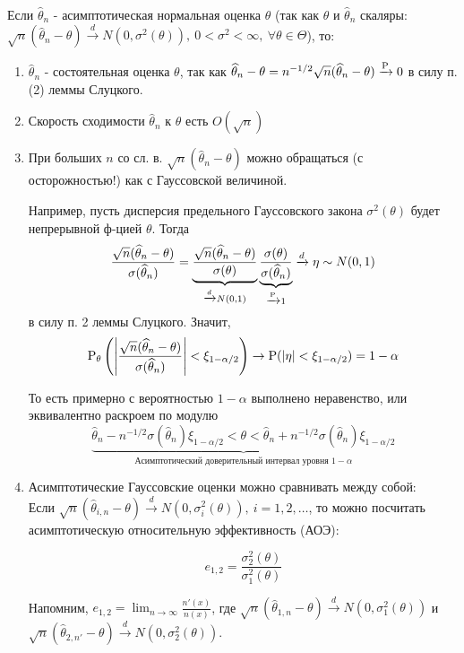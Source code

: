 Если \(\widehat{\theta}_n\) - асимптотическая нормальная оценка \(\theta\) (так как \(\theta\) и \(\widehat{\theta}_n\) скаляры:
\(\sqrt{n}(\widehat{\theta}_n - \theta) \xrightarrow{d} N(0, \sigma^2(\theta)),\ 0 < \sigma^2 < \infty,\ \forall \theta \in \Theta\)), то:
\begin{enumerate}
    \item \(\widehat{\theta}_n\) - состоятельная оценка \(\theta\), так как \(\widehat{\theta}_n - \theta = n^{-1/2} \sqrt{n}(\widehat{\theta}_n - \theta) \xrightarrow{\P} 0\)
        в силу п. (2) леммы Слуцкого.
    \item Скорость сходимости \(\widehat{\theta}_n\) к \(\theta\) есть \(O(\sqrt{n})\)
    \item При больших \(n\) со сл. в. \(\sqrt{n}(\widehat{\theta}_n - \theta)\) можно обращаться (с осторожностью!) как с Гауссовской величиной.

    Например, пусть дисперсия предельного Гауссовского закона \(\sigma^2(\theta)\) будет непрерывной ф-цией \(\theta\). Тогда
    \[ \frac{\sqrt{n}(\widehat{\theta}_n - \theta)}{\sigma(\widehat{\theta}_n)} =
    \underbrace{\frac{\sqrt{n}(\widehat{\theta}_n - \theta)}{\sigma(\theta)}}_{\xrightarrow{d} N(0, 1)}
    \underbrace{\frac{\sigma(\theta)}{\sigma(\widehat{\theta}_n)}}_{\xrightarrow{\P} 1} \xrightarrow{d} \eta \sim N(0, 1)\]
    в силу п. 2 леммы Слуцкого. Значит,
    \[\P_\theta \left(\left\lvert \frac{\sqrt{n}(\widehat{\theta}_n - \theta)}{\sigma(\widehat{\theta}_n)} \right\rvert  < \xi_{1 - \alpha/2}\right) \rightarrow \P(\left\lvert \eta \right\rvert  < \xi_{1 - \alpha/2}) = 1 - \alpha\]

    То есть примерно с вероятностью \(1 - \alpha\) выполнено неравенство, или эквивалентно раскроем по модулю
    \[\underbrace{\widehat{\theta}_n - n^{-1/2}\sigma(\widehat{\theta}_n)\xi_{1 - \alpha /2} < \theta < \widehat{\theta}_n + n^{-1/2}\sigma(\widehat{\theta}_n)\xi_{1 - \alpha /2}}_{\mbox{Асимптотический доверительный интервал уровня \(1 - \alpha\)}}\]

    \item Асимптотические Гауссовские оценки можно сравнивать между собой: \\
    Если \(\sqrt{n} (\widehat{\theta}_{i,n} - \theta) \xrightarrow{d} N(0, \sigma^2_{i}(\theta)),\ i = 1, 2, \ldots\), то
    можно посчитать асимптотическую относительную эффективность (АОЭ):

    \[e_{1,2} = \frac{\sigma_2^2(\theta)}{\sigma_1^2(\theta)}\]

    Напомним, $e_{1, 2} = \lim_{n \to \infty} \frac{n'(x)}{n (x)}$, где
    $\sqrt{n}(\widehat{\theta}_{1,n}-\theta)\xrightarrow{d}N(0, \sigma_1^2(\theta))$
    и \(\sqrt{n}(\widehat{\theta}_{2,n'} - \theta) \xrightarrow{d} N(0, \sigma_2^2(\theta))\).

\end{enumerate}

